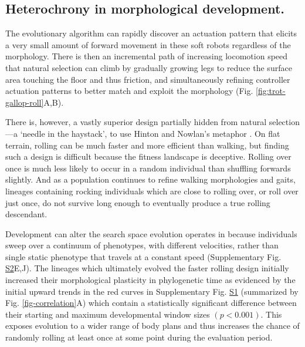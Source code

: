 \subsection{Heterochrony in morphological development.}


The evolutionary algorithm can rapidly discover an actuation pattern that elicits a very small amount of forward movement in these soft robots regardless of the morphology. 
There is then an incremental path of increasing locomotion speed that natural selection can climb by gradually growing legs to reduce the surface area touching the floor and thus friction, and simultaneously refining controller actuation patterns to better match and exploit the morphology (Fig. \ref{fig:trot-gallop-roll}A,B).


There is, however, a vastly superior design partially hidden from natural selection---a `needle in the haystack', to use Hinton and Nowlan's metaphor \cite{hinton1987learning}.
On flat terrain, rolling can be much faster and more efficient than walking, but finding such a design is difficult because the fitness landscape is deceptive.
Rolling over once is much less likely to occur in a random individual than shuffling forwards slightly. And as a population continues to refine walking morphologies and gaits, lineages containing rocking individuals which are close to rolling over, or roll over just once, do not survive long enough to eventually produce a true rolling descendant. 

Development can alter the search space evolution operates in because individuals sweep over a continuum of phenotypes, with different velocities, rather than single static phenotype that travels at a constant speed (Supplementary Fig. \hyperref[fig:S2]{S2}E,J).
The lineages which ultimately evolved the faster rolling design initially increased their morphological plasticity in phylogenetic time as evidenced by the initial upward trends in the red curves in Supplementary Fig. \hyperref[fig:S1]{S1} (summarized by Fig. \ref{fig-correlation}A) which contain a statistically significant difference between their starting and maximum developmental window sizes $(p<0.001)$.
This exposes evolution to a wider range of body plans and thus increases the chance of randomly rolling at least once at some point during the evaluation period.

